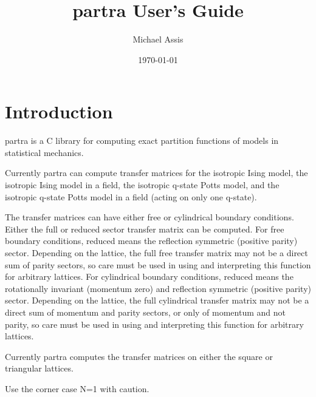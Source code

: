 \documentclass{article}
\begin{document}
\title{partra User's Guide}
\author{Michael Assis}
\date{\today}
\maketitle


\section{Introduction}
partra is a C library for computing exact partition functions of models in statistical mechanics. 

Currently partra can compute transfer matrices for the isotropic Ising model, the isotropic Ising model in a field, the isotropic q-state Potts model, and the isotropic q-state Potts model in a field (acting on only one q-state).

The transfer matrices can have either free or cylindrical boundary conditions. Either the full or reduced sector transfer matrix can be computed. For free boundary conditions, reduced means the reflection symmetric (positive parity) sector. Depending on the lattice, the full free transfer matrix may not be a direct sum of parity sectors, so care must be used in using and interpreting this function for arbitrary lattices. For cylindrical boundary conditions, reduced means the rotationally invariant (momentum zero) and reflection symmetric (positive parity) sector. Depending on the lattice, the full cylindrical transfer matrix may not be a direct sum of momentum and parity sectors, or only of momentum and not parity, so care must be used in using and interpreting this function for arbitrary lattices.

Currently partra computes the transfer matrices on either the square or triangular lattices. 

Use the corner case N=1 with caution.
\end{document}
